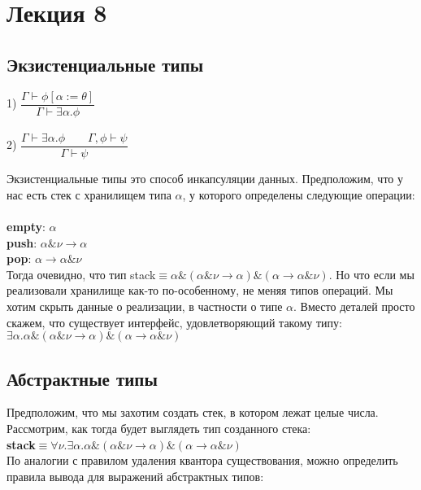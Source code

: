 \section{Лекция 8}

\subsection{Экзистенциальные типы}
	 1) $\dfrac{\Gamma\vdash\phi[\alpha:=\theta]}{\Gamma\vdash\exists\alpha.\phi}$\\ \\
	 2) $\dfrac{\Gamma\vdash\exists\alpha.\phi\qquad\Gamma,\phi\vdash\psi}{\Gamma\vdash\psi}$
	 
	  Экзистенциальные типы это способ инкапсуляции данных. Предположим, что у нас есть стек с хранилищем типа $\alpha$, у которого определены следующие операции:\\\\
	 \textbf{empty}: $\alpha$\\
	 \textbf{push}: $\alpha\&\nu\rightarrow\alpha$\\
	 \textbf{pop}: $\alpha\rightarrow\alpha\&\nu$\\
	 
	 Тогда очевидно, что тип stack$\equiv\alpha\&(\alpha\&\nu\rightarrow\alpha)\&(\alpha\rightarrow\alpha\&\nu)$.
	 Но что если мы реализовали хранилище как-то по-особенному, не меняя типов операций. Мы хотим скрыть данные о реализации, в частности о типе $\alpha$. Вместо деталей просто скажем, что существует интерфейс, удовлетворяющий такому типу:\\$\exists\alpha.\alpha\&(\alpha\&\nu\rightarrow\alpha)\&(\alpha\rightarrow\alpha\&\nu)$
	 
\subsection{Абстрактные типы}	 
	 Предположим, что мы захотим создать стек, в котором лежат целые числа. Рассмотрим, как тогда будет выглядеть тип созданного стека: \\
	 \textbf{stack}$\equiv\forall\nu.\exists\alpha.\alpha\&(\alpha\&\nu\rightarrow\alpha)\&(\alpha\rightarrow\alpha\&\nu)$\\
 	По аналогии с правилом удаления квантора существования, можно определить правила вывода для выражений абстрактных типов: \\

